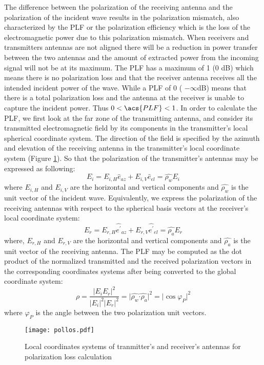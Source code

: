 The difference between the polarization of the receiving antenna and the polarization of the incident wave results in the polarization mismatch, also characterized by the \acf{PLF} or the polarization efficiency which is the loss of the electromagnetic power due to this polarization mismatch. When receivers and transmitters antennas are not aligned there will be a reduction in power transfer between the two antennas and the amount of extracted power from the incoming signal will not be at its maximum. The \acs{PLF} has a maximum of 1 (0 dB) which means there is no polarization loss and that the receiver antenna receives all the intended incident power of the wave. While a \acs{PLF} of 0 ( $ -\infty $dB) means that there is a total polarization loss and the antenna at the receiver is unable to capture the incident power. Thus  $0<\acs{PLF}<1$. In order to calculate the \acs{PLF}, we first look at the far zone of the transmitting antenna, and consider its transmitted electromagnetic field by its components in the transmitter's local spherical coordinate system. The direction of the field is specified by the azimuth and elevation of the receiving antenna in the transmitter's local coordinate system (Figure \ref{pollos}). So that the polarization of the transmitter's antennas may be expressed as following:
\begin{equation}
E_{i}= E_{i,H}\hat{e}_{az}+ E_{i,V}\hat{e}_{el}= \widehat{ \rho _{w}}E_{i} \label{eq_pollos}
\end{equation} 
where $E_{i,H}$ and  $E_{i,V}$  are the horizontal and vertical components and  $\widehat{ \rho _{w}}$ is the unit vector of the incident wave. Equivalently, we express the polarization of the receiving antennas with respect to the spherical basis vectors at the receiver's local coordinate system:  
\begin{equation}
E_{r}= E_{r,H}\widehat{e^{'}}_{az}+ E_{r,V}\widehat{e^{'}}_{el}= \widehat{ \rho _{a}}E_{r}
\end{equation}
where,  $E_{r,H}$ and $E_{r,V}$ are the horizontal and vertical components and $\widehat{ \rho _{a}}$ is the unit vector of the receiving antenna. The \acs{PLF} may be computed as the dot product of the normalized transmitted and the received polarization vectors in the corresponding coordinates systems after being converted to the global coordinate system:
\begin{equation}
\rho =\frac{ \vert E_{i}E_{r} \vert ^{2}}{ \vert E_{i} \vert ^{2} \vert E_{r} \vert ^{2}}=  \vert \widehat{ \rho _{w}}\widehat{ \cdot  \rho _{a}} \vert ^{2}=  \vert \cos  \varphi _{P} \vert ^{2}
\end{equation}
where $\varphi _{P}$ is the angle between the two polarization unit vectors.
\begin{figure}[H]
\vspace{-1cm} 
	\begin{center}
		\texttt{[image: pollos.pdf]}
	\vspace{-1cm} 	\caption{\label{pollos} Local coordinates systems of tranmitter's and receiver's antennas for polarization loss calculation}
	\end{center}
\end{figure}


